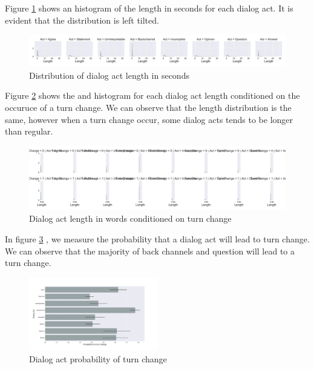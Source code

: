 Figure \ref{dactssecsbyname} shows an histogram of the length in seconds for each dialog act. It is evident that the distribution is left tilted.

 \begin{figure}[ht!]
 \centering
 \includegraphics[width=\textwidth]{../scikitlearn/figures/grid_secs_by_da_name.pdf}
 \caption{Distribution of dialog act length in seconds \label{overflow}}
 \label{dactssecsbyname}
  \end{figure}

 Figure \ref{l3} shows the and histogram for each dialog act length conditioned on the occuruce of a turn change. We can observe that the length distribution is the same, however when a turn change occur, some
 dialog acts tends to be longer than regular.

\begin{figure}[ht!]
 \centering
 \includegraphics[width=\textwidth]{../scikitlearn/figures/grid_secs_by_da_name_by_tchange.pdf}
 \caption{Dialog act length in words conditioned on turn change\label{overflow}}
 \label{l3}
 \end{figure}

In figure \ref{l4} , we measure the probability that a dialog act will lead to turn change. We can observe that the majority of back channels and question will lead to a turn change.

\begin{figure}[ht!]
\centering
\includegraphics[width=0.5\textwidth]{../scikitlearn/figures/barplot_da_prob_to_tchange.png}
\caption{Dialog act probability of turn change\label{overflow}}
\label{l4}
\end{figure}


